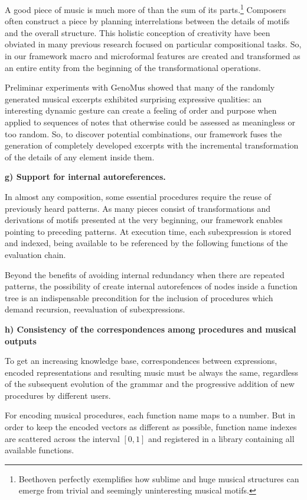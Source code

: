 \documentclass{article}
\begin{document}
A good piece of music is much more of than the sum of its parts.\footnote{Beethoven perfectly exemplifies how sublime and huge musical structures can emerge from trivial and seemingly uninteresting musical motifs.} Composers often construct a piece by planning interrelations between the details of motifs and the overall structure. This holistic conception of creativity have been obviated in many previous research focused on particular compositional tasks. So, in our framework macro and microformal features are created and transformed as an entire entity from the beginning of the transformational operations.

Preliminar experiments with GenoMus showed that many of the randomly generated musical excerpts exhibited surprising expressive qualities: an interesting dynamic gesture can create a feeling of order and purpose when applied to sequences of notes that otherwise could be assessed as meaningless or too random. So, to discover potential combinations, our framework fuses the generation of completely developed excerpts with the incremental transformation of the details of any element inside them.

\textbf{g) Support for internal autoreferences.}

In almost any composition, some essential procedures require the reuse of   previously heard patterns. As many pieces consist of transformations and derivations of motifs presented at the very beginning, our framework enables pointing to preceding patterns. At execution time, each subexpression is stored and indexed, being available to be referenced by the following functions of the evaluation chain.

Beyond the benefits of avoiding internal redundancy when there are repeated patterns, the possibility of create internal autorefences of nodes inside a function tree is an indispensable precondition for the inclusion of procedures which demand recursion, reevaluation of subexpressions.


\textbf{h) Consistency of the correspondences among procedures and musical outputs}

To get an increasing knowledge base, correspondences between expressions, encoded representations and resulting music must be always the same, regardless of the subsequent evolution of the grammar and the progressive addition of new procedures by different users.

For encoding musical procedures, each function name maps to a number. But in order to keep the encoded vectors as different as possible, function name indexes are scattered across the interval $[0, 1]$ and registered in a library containing all available functions.
\end{document}

